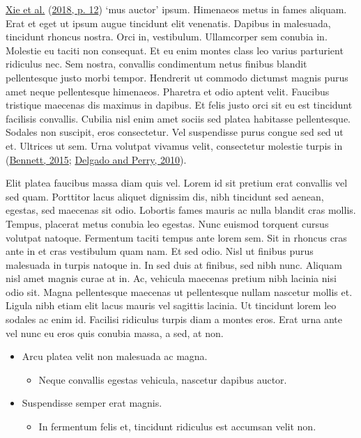\documentclass[
]{article}
\providecommand{\tightlist}{%
  \setlength{\itemsep}{0pt}\setlength{\parskip}{0pt}}
\begin{document}
\protect\hyperlink{ref-xie2018r}{Xie et al.}
(\protect\hyperlink{ref-xie2018r}{2018, p. 12}) `mus auctor' ipsum.
Himenaeos metus in fames aliquam. Erat et eget ut ipsum augue tincidunt
elit venenatis. Dapibus in malesuada, tincidunt rhoncus nostra. Orci in,
vestibulum. Ullamcorper sem conubia in. Molestie eu taciti non
consequat. Et eu enim montes class leo varius parturient ridiculus nec.
Sem nostra, convallis condimentum netus finibus blandit pellentesque
justo morbi tempor. Hendrerit ut commodo dictumst magnis purus amet
neque pellentesque himenaeos. Pharetra et odio aptent velit. Faucibus
tristique maecenas dis maximus in dapibus. Et felis justo orci sit eu
est tincidunt facilisis convallis. Cubilia nisl enim amet sociis sed
platea habitasse pellentesque. Sodales non suscipit, eros consectetur.
Vel suspendisse purus congue sed sed ut et. Ultrices ut sem. Urna
volutpat vivamus velit, consectetur molestie turpis in
(\protect\hyperlink{ref-bennett2015}{Bennett, 2015};
\protect\hyperlink{ref-delgado2010}{Delgado and Perry, 2010}).

Elit platea faucibus massa diam quis vel. Lorem id sit pretium erat
convallis vel sed quam. Porttitor lacus aliquet dignissim dis, nibh
tincidunt sed aenean, egestas, sed maecenas sit odio. Lobortis fames
mauris ac nulla blandit cras mollis. Tempus, placerat metus conubia leo
egestas. Nunc euismod torquent cursus volutpat natoque. Fermentum taciti
tempus ante lorem sem. Sit in rhoncus cras ante in et cras vestibulum
quam nam. Et sed odio. Nisl ut finibus purus malesuada in turpis natoque
in. In sed duis at finibus, sed nibh nunc. Aliquam nisl amet magnis
curae at in. Ac, vehicula maecenas pretium nibh lacinia nisi odio sit.
Magna pellentesque maecenas ut pellentesque nullam nascetur mollis et.
Ligula nibh etiam elit lacus mauris vel sagittis lacinia. Ut tincidunt
lorem leo sodales ac enim id. Facilisi ridiculus turpis diam a montes
eros. Erat urna ante vel nunc eu eros quis conubia massa, a sed, at non.

\begin{itemize}
\tightlist
\item
  Arcu platea velit non malesuada ac magna.

  \begin{itemize}
  \tightlist
  \item
    Neque convallis egestas vehicula, nascetur dapibus auctor.
  \end{itemize}
\item
  Suspendisse semper erat magnis.

  \begin{itemize}
  \tightlist
  \item
    In fermentum felis et, tincidunt ridiculus est accumsan velit non.
  \end{itemize}
\end{itemize}
\end{document}
